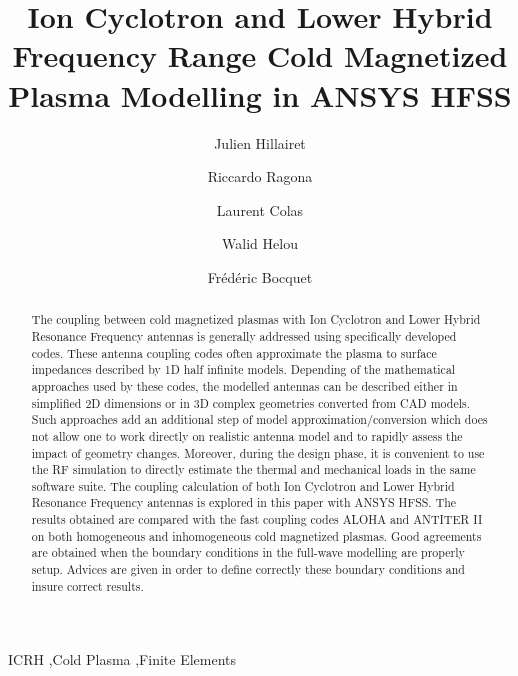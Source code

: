 \documentclass[preprint,3p,twocolumn]{elsarticle}
\begin{document}
\begin{frontmatter}

\title{Ion Cyclotron and Lower Hybrid Frequency Range Cold Magnetized Plasma Modelling in {ANSYS} {HFSS}}
\author[IRFM]{Julien Hillairet}
\author[ERM]{Riccardo Ragona}
\author[IRFM]{Laurent Colas}
\author[IRFM]{Walid Helou}
\author[ANSYS]{Frédéric Bocquet}

\address[IRFM]{CEA, IRFM, F-13108 Saint Paul-lez-Durance, France}
\address[ERM]{Laboratory for Plasma Physics, Royal Military Academy, (LPP-ERM/KMS), BE-1000, Brussels, Belgium}
\address[ANSYS]{ANSYS France}

\begin{abstract}
The coupling between cold magnetized plasmas with Ion Cyclotron and Lower Hybrid Resonance Frequency antennas is generally addressed using specifically developed codes. These antenna coupling codes often approximate the plasma to surface impedances described by 1D half infinite models. Depending of the mathematical approaches used by these codes, the modelled antennas can be described either in simplified 2D dimensions or in 3D complex geometries converted from CAD models. Such approaches add an additional step of model approximation/conversion which does not allow one to work directly on realistic antenna model and to rapidly assess the impact of geometry changes. Moreover, during the design phase, it is convenient to use the RF simulation to directly estimate the thermal and mechanical loads in the same software suite. The coupling calculation of both Ion Cyclotron and Lower Hybrid Resonance Frequency antennas is explored in this paper with ANSYS HFSS. The results obtained are compared with the fast coupling codes ALOHA and ANTITER II on both homogeneous and inhomogeneous cold magnetized plasmas. Good agreements are obtained when the boundary conditions in the full-wave modelling are properly setup. Advices are given in order to define correctly these boundary conditions and insure correct results.
\end{abstract}

\begin{keyword}
ICRH \sep Cold Plasma \sep Finite Elements
\end{keyword}

\end{frontmatter}
\end{document}
